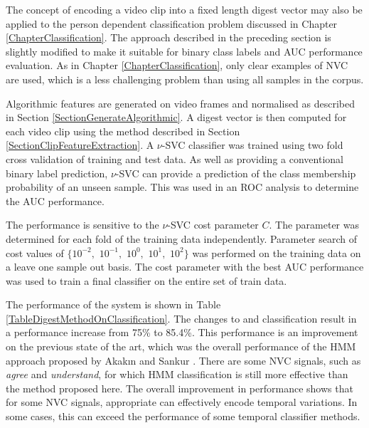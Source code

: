 The concept of encoding a video clip into a fixed length digest vector may also be applied to the person dependent classification problem discussed in Chapter \ref{ChapterClassification}. The approach described in the preceding section is slightly modified to make it suitable for binary class labels and \ac{AUC} performance evaluation. As in Chapter \ref{ChapterClassification}, only clear examples of \ac{NVC} are used, which is a less challenging problem than using all samples in the corpus.

Algorithmic features are generated on video frames and normalised as described in Section \ref{SectionGenerateAlgorithmic}. A digest vector is then computed for each video clip using the method described in Section \ref{SectionClipFeatureExtraction}. A $\nu$-SVC classifier \cite{Scholkopf2000} was trained using two fold cross validation of training and test data. As well as providing a conventional binary label prediction, $\nu$-SVC can provide a prediction of the class membership probability of an unseen sample. This was used in an \ac{ROC} analysis to determine the \ac{AUC} performance.

The performance is sensitive to the $\nu$-SVC cost parameter $C$. The parameter was determined for each fold of the training data independently. Parameter search of cost values of $\{10^{-2},$ $10^{-1},$ $10^{0},$ $10^{1},$ $10^{2}\}$ was performed on the training data on a leave one sample out basis. The cost parameter with the best \ac{AUC} performance was used to train a final classifier on the entire set of train data.

The performance of the system is shown in Table \ref{TableDigestMethodOnClassification}. The changes to \featureGeneration and classification result in a performance increase from 75\% to 85.4\%. This performance is an improvement on the previous state of the art, which was the overall performance of the \ac{HMM} approach proposed by Akak{\i}n and Sankur \cite{Akakin2011}. There are some \ac{NVC} signals, such as \textit{agree} and \textit{understand}, for which \ac{HMM} classification is still more effective than the method proposed here. The overall improvement in performance shows that for some \ac{NVC} signals, appropriate \featureGeneration can effectively encode temporal variations. In some cases, this can exceed the performance of some temporal classifier methods.

